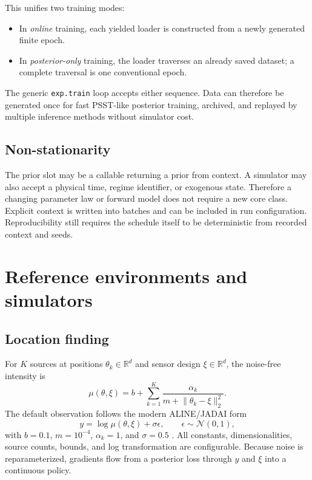 \documentclass[11pt]{article}
\begin{document}
This unifies two training modes:
\begin{itemize}
  \item In \emph{online} training, each yielded loader is constructed from a newly
  generated finite epoch.
  \item In \emph{posterior-only} training, the loader traverses an already saved
  dataset; a complete traversal is one conventional epoch.
\end{itemize}
The generic \texttt{exp.train} loop accepts either sequence. Data can therefore be
generated once for fast PSST-like posterior training, archived, and replayed by
multiple inference methods without simulator cost.

\subsection{Non-stationarity}

The prior slot may be a callable returning a prior from context. A simulator may also
accept a physical time, regime identifier, or exogenous state. Therefore a changing
parameter law or forward model does not require a new core class. Explicit context is
written into batches and can be included in run configuration. Reproducibility still
requires the schedule itself to be deterministic from recorded context and seeds.

\section{Reference environments and simulators}

\subsection{Location finding}

For $K$ sources at positions $\theta_k\in\mathbb{R}^d$ and sensor design
$\xi\in\mathbb{R}^d$, the noise-free intensity is
\begin{equation}
 \mu(\theta,\xi) = b + \sum_{k=1}^{K}
 \frac{\alpha_k}{m + \lVert\theta_k-\xi\rVert_2^2}.
\end{equation}
The default observation follows the modern ALINE/JADAI form
\begin{equation}
 y = \log \mu(\theta,\xi) + \sigma\epsilon,
 \qquad \epsilon\sim\mathcal{N}(0,1),
\end{equation}
with $b=0.1$, $m=10^{-4}$, $\alpha_k=1$, and $\sigma=0.5$
\cite{huang2025aline,bracher2025jadai}. All constants, dimensionalities, source
counts, bounds, and log transformation are configurable. Because noise is
reparameterized, gradients flow from a posterior loss through $y$ and $\xi$ into a
continuous policy.
\end{document}
